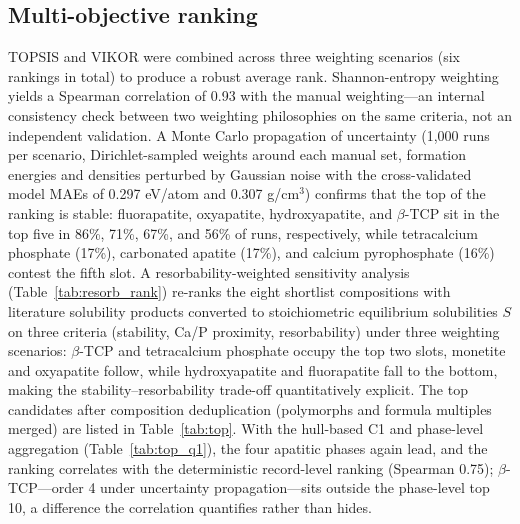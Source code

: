 \documentclass[review,11pt,a4paper]{elsarticle}
\begin{document}
\subsection{Multi-objective ranking}\label{sec:ranking}
TOPSIS and VIKOR were combined across three weighting scenarios (six rankings in total) to produce a robust average rank. Shannon-entropy weighting yields a Spearman correlation of 0.93 with the manual weighting---an internal consistency check between two weighting philosophies on the same criteria, not an independent validation. A Monte Carlo propagation of uncertainty (1{,}000 runs per scenario, Dirichlet-sampled weights around each manual set, formation energies and densities perturbed by Gaussian noise with the cross-validated model MAEs of 0.297 eV/atom and 0.307 g/cm$^3$) confirms that the top of the ranking is stable: fluorapatite, oxyapatite, hydroxyapatite, and $\beta$-TCP sit in the top five in 86\%, 71\%, 67\%, and 56\% of runs, respectively, while tetracalcium phosphate (17\%), carbonated apatite (17\%), and calcium pyrophosphate (16\%) contest the fifth slot. A resorbability-weighted sensitivity analysis (Table~\ref{tab:resorb_rank}) re-ranks the eight shortlist compositions with literature solubility products converted to stoichiometric equilibrium solubilities $S$ on three criteria (stability, Ca/P proximity, resorbability) under three weighting scenarios: $\beta$-TCP and tetracalcium phosphate occupy the top two slots, monetite and oxyapatite follow, while hydroxyapatite and fluorapatite fall to the bottom, making the stability--resorbability trade-off quantitatively explicit. The top candidates after composition deduplication (polymorphs and formula multiples merged) are listed in Table~\ref{tab:top}. With the hull-based C1 and phase-level aggregation (Table~\ref{tab:top_q1}), the four apatitic phases again lead, and the ranking correlates with the deterministic record-level ranking (Spearman 0.75); $\beta$-TCP---order 4 under uncertainty propagation---sits outside the phase-level top 10, a difference the correlation quantifies rather than hides.
\end{document}
